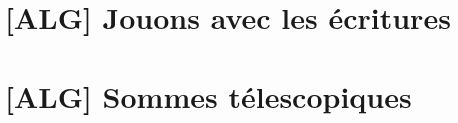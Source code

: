 \section{[ALG] Jouons avec les écritures} \label{power-q:rewriting}

	


\section{[ALG] Sommes télescopiques} \label{power-q:telescopic}

	
